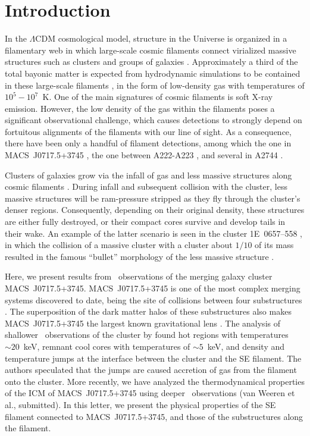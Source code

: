 \section{Introduction}


In the $\Lambda$CDM cosmological model, structure in the Universe is organized in a filamentary web in which large-scale cosmic filaments connect virialized massive structures such as clusters and groups of galaxies \citep[e.g., ][]{Einasto1994}. Approximately a third of the total bayonic matter is expected from hydrodynamic simulations to be contained in these large-scale filaments \citep[e.g.][]{Dave2001}, in the form of low-density gas with temperatures of $10^5-10^7$~K. One of the main signatures of cosmic filaments is soft X-ray emission. However, the low density of the gas within the filaments poses a significant observational challenge, which causes detections to strongly depend on fortuitous alignments of the filaments with our line of sight. As a consequence, there have been only a handful of filament detections, among which the one in MACS~J0717.5+3745 \citep{Ebeling2004}, the one between A222-A223 \citep{Dietrich2005, Werner2008}, and several in A2744 \citep{Eckert2015}.

Clusters of galaxies grow via the infall of gas and less massive structures along cosmic filaments \citep[e.g.,][]{Springel2006}. During infall and subsequent collision with the cluster, less massive structures will be ram-pressure stripped as they fly through the cluster's denser regions. Consequently, depending on their original density, these structures are either fully destroyed, or their compact cores survive and develop tails in their wake. An example of the latter scenario is seen in the cluster 1E~0657--558 \citep{Elvis1992}, in which the collision of a massive cluster with a cluster about $1/10$ of its mass \citep{Springel2007, Mastropietro2008} resulted in the famous ``bullet'' morphology of the less massive structure \citep{Markevitch2002}.

Here, we present results from \chandra\ observations of the merging galaxy cluster MACS~J0717.5+3745. MACS~J0717.5+3745 \citep[$z=0.546$;][]{Ebeling2001, Ebeling2007} is one of the most complex merging systems discovered to date, being the site of collisions between four substructures \citep{Ma2009, Medezinski2013}. The superposition of the dark matter halos of these substructures also makes MACS~J0717.5+3745 the largest known gravitational lens \citep{Zitrin2009, Medezinski2013}. The analysis of shallower \chandra\ observations of the cluster by \citet{Ma2009} found hot regions with temperatures $\sim 20$~keV, remnant cool cores with temperatures of $\sim 5$~keV, and density and temperature jumps at the interface between the cluster and the SE filament. The authors speculated that the jumps are caused accretion of gas from the filament onto the cluster. More recently, we have analyzed the thermodynamical properties of the ICM of MACS~J0717.5+3745 using deeper \chandra\ observations (van Weeren et al., submitted). In this letter, we present the physical properties of the SE filament connected to MACS~J0717.5+3745, and those of the substructures along the filament.

